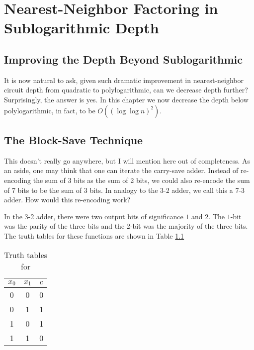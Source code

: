 \chapter{Nearest-Neighbor Factoring in Sublogarithmic Depth}
\label{chap:fsl}







\section{Improving the Depth Beyond Sublogarithmic}

It is now natural to ask, given such dramatic improvement in
nearest-neighbor circuit
depth from quadratic \cite{Kutin2006} to polylogarithmic, can we
decrease depth further? Surprisingly, the answer is yes. In this
chapter we now decrease the depth below polylogarithmic, in fact,
to be $O((\log \log n)^2)$.

\section{The Block-Save Technique}

This doesn't really go anywhere, but I will mention here out of
completeness.
As an aside, one may think that one can iterate the carry-save
adder. Instead of re-encoding the sum of 3 bits as the sum of
2 bits, we could also re-encode the sum of 7 bits to be the
sum of 3 bits. In analogy to the 3-2 adder, we call this a 7-3 adder.
How would this re-encoding work?

In the 3-2 adder, there were two output bits of significance $1$
and $2$. The $1$-bit was the parity of the three bits and
the $2$-bit was the majority of the three bits. The truth tables
for these functions are shown in Table \ref{tab:3-2}

\begin{table}
\begin{tabular}{cc|c}
\hline
$x_0$ & $x_1$ & $c$ \\
\hline
0 & 0 & 0 \\
0 & 1 & 1 \\
1 & 0 & 1 \\
1 & 1 & 0 \\
\hline
\end{tabular}
\caption{Truth tables for}
\label{tab:3-2}
\end{table}

